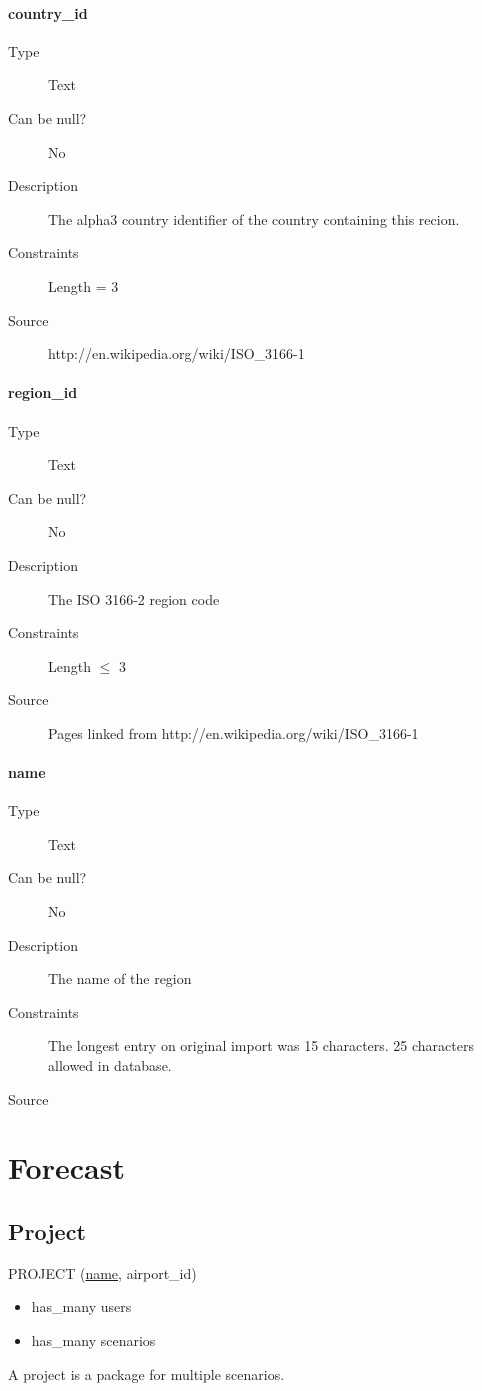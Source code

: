 \documentclass[]{report}
\begin{document}
\paragraph{country\_id}
	\begin{description}
	\item[Type]Text
	\item[Can be null?]No
	\item[Description]The alpha3 country identifier of the country containing this recion.
	\item[Constraints]Length = 3
	\item[Source]http://en.wikipedia.org/wiki/ISO\_3166-1
	\end{description}
\paragraph{region\_id}
	\begin{description}
	\item[Type]Text
	\item[Can be null?]No
	\item[Description]The ISO 3166-2 region code
	\item[Constraints]Length $\le$ 3
	\item[Source]Pages linked from http://en.wikipedia.org/wiki/ISO\_3166-1
	\end{description}
\paragraph{name}
	\begin{description}
	\item[Type]Text
	\item[Can be null?]No
	\item[Description]The name of the region
	\item[Constraints]The longest entry on original import was 15 characters. 25 characters allowed in database.
	\item[Source]
	\end{description}
\section{Forecast}
\subsection{Project}
PROJECT (\underline{name}, airport\_id)
\begin{itemize}
\item has\_many users
\item has\_many scenarios
\end{itemize}
A project is a package for multiple scenarios.
\end{document}
